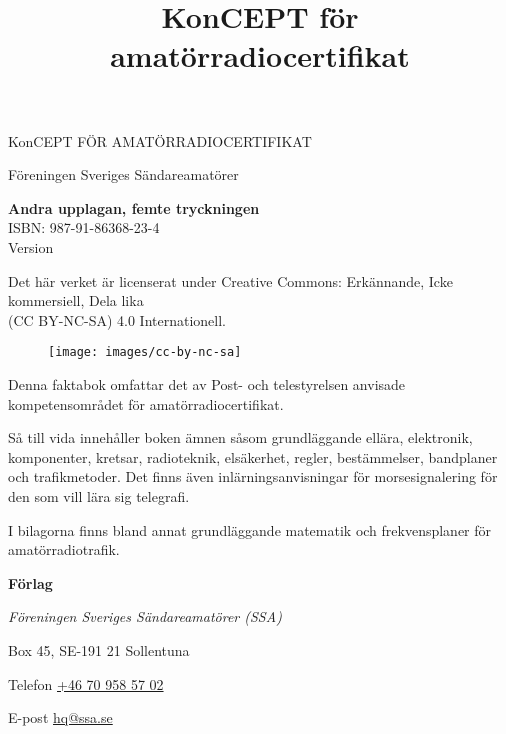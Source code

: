 \onecolumn{}
\vspace{10em}
\title{KonCEPT för amatörradiocertifikat}
\begin{center}
\Large{KonCEPT FÖR AMATÖRRADIOCERTIFIKAT}

Föreningen Sveriges Sändareamatörer\\[2\baselineskip]
\end{center}

\noindent \textbf{Andra upplagan, femte tryckningen}\\
\noindent ISBN: 987-91-86368-23-4\\
\noindent Version \revision
\bigskip

\noindent Det här verket är licenserat under Creative Commons:\newline
\noindent Erkännande, Icke kommersiell, Dela lika\\
\noindent (CC BY-NC-SA) 4.0 Internationell.
\begin{figure}[h]
    \texttt{[image: images/cc-by-nc-sa]}
\end{figure}

\vfill

\noindent Denna faktabok omfattar det av Post- och tele\-styrel\-sen anvisade
kompetensområdet för amatörradiocertifikat.

\bigskip

\noindent Så till vida innehåller boken ämnen såsom grundläggande ellära, elektronik, komponenter,
kretsar, radioteknik, elsäkerhet, regler, bestämmelser, bandplaner och tra\-fik\-metoder.
Det finns även inlärningsanvisningar för morsesignalering för den
som vill lära sig telegrafi.

\bigskip

\noindent I bilagorna finns bland annat grundläggande matematik
och frekvensplaner för ama\-törradiotrafik. 

\vfill

\noindent \textbf{Förlag}

\smallskip

\noindent\textit{Föreningen Sveriges Sändareamatörer (SSA)}

\smallskip\noindent Box 45, SE-191 21 Sollentuna

\smallskip

\noindent Telefon \href{tel:+46709585702}{+46 70 958 57 02}


\smallskip\noindent E-post \href{mailto:hq@ssa.se}{hq@ssa.se}


\restoregeometry\twocolumn
{}
